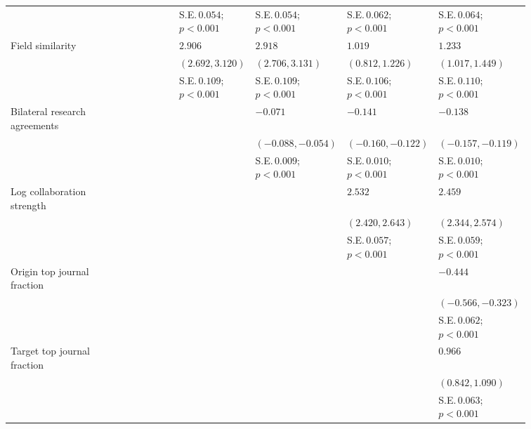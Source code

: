 \begin{table}[H]
{\begin{tabular}{p{0.2\linewidth}p{0.11\linewidth}p{0.11\linewidth}p{0.11\linewidth}p{0.11\linewidth}p{0.11\linewidth}p{0.11\linewidth}}
 &  &  & S.E.\,$0.054$; ${p < 0.001}$ & S.E.\,$0.054$; ${p < 0.001}$ & S.E.\,$0.062$; ${p < 0.001}$ & S.E.\,$0.064$; ${p < 0.001}$\\ [0.8ex]  
Field similarity &  &  & $2.906$ & $2.918$ & $1.019$ & $1.233$\\ 
 &  &  & $(2.692, 3.120)$ & $(2.706, 3.131)$ & $(0.812, 1.226)$ & $(1.017, 1.449)$\\ 
 &  &  & S.E.\,$0.109$; ${p < 0.001}$ & S.E.\,$0.109$; ${p < 0.001}$ & S.E.\,$0.106$; ${p < 0.001}$ & S.E.\,$0.110$; ${p < 0.001}$\\ [0.8ex]  
Bilateral research agreements &  &  &  & $-0.071$ & $-0.141$ & $-0.138$\\ 
 &  &  &  & $(-0.088, -0.054)$ & $(-0.160, -0.122)$ & $(-0.157, -0.119)$\\ 
 &  &  &  & S.E.\,$0.009$; ${p < 0.001}$ & S.E.\,$0.010$; ${p < 0.001}$ & S.E.\,$0.010$; ${p < 0.001}$\\ [0.8ex]  
Log collaboration strength &  &  &  &  & $2.532$ & $2.459$\\ 
 &  &  &  &  & $(2.420, 2.643)$ & $(2.344, 2.574)$\\ 
 &  &  &  &  & S.E.\,$0.057$; ${p < 0.001}$ & S.E.\,$0.059$; ${p < 0.001}$\\ [0.8ex]  
Origin top journal fraction &  &  &  &  &  & $-0.444$\\ 
 &  &  &  &  &  & $(-0.566, -0.323)$\\ 
 &  &  &  &  &  & S.E.\,$0.062$; ${p < 0.001}$\\ [0.8ex]  
Target top journal fraction &  &  &  &  &  & $0.966$\\ 
 &  &  &  &  &  & $(0.842, 1.090)$\\ 
 &  &  &  &  &  & S.E.\,$0.063$; ${p < 0.001}$\\ [0.8ex]  
\hline 
\end{tabular}
}
\end{table}
